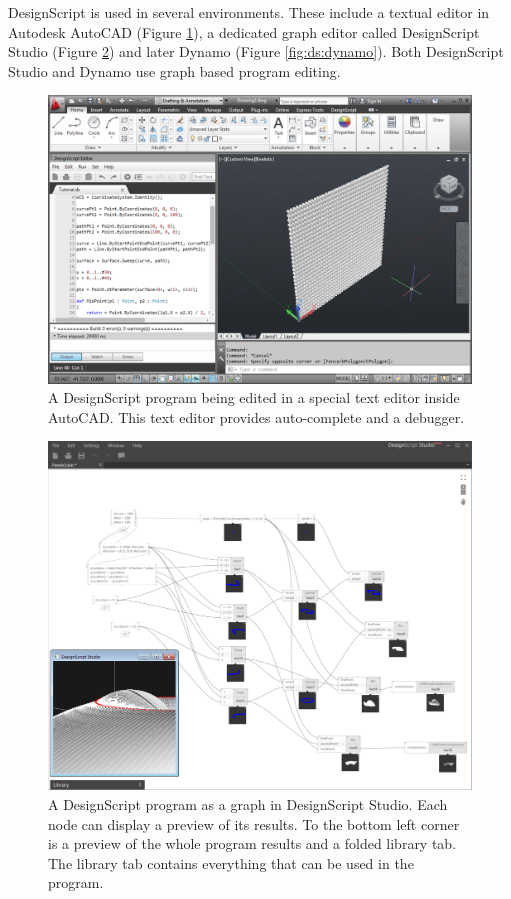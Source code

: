 \documentclass{./llncs2e/llncs}
\begin{document}
	DesignScript is used in several environments. 
	These include a textual editor in Autodesk AutoCAD (Figure \ref{fig:ds:autocad}), a dedicated graph editor called DesignScript Studio (Figure \ref{fig:ds:dsstudio}) and later Dynamo (Figure \ref{fig:ds:dynamo}). 
	Both DesignScript Studio and Dynamo use graph based program editing.
	
	\begin{figure}
		\centering
		\includegraphics[width=1.0\textwidth]{img/ds_autocad}
		\caption{A DesignScript program being edited in a special text editor inside AutoCAD. This text editor provides auto-complete and a debugger.}
		\label{fig:ds:autocad}
	\end{figure} 
	
	\begin{figure}
		\centering
		\includegraphics[width=1.0\textwidth]{img/ds_dsstudio}
		\caption{A DesignScript program as a graph in DesignScript Studio. Each node can display a preview of its results. To the bottom left corner is a preview of the whole program results and a folded library tab. The library tab contains everything that can be used in the program.}
		\label{fig:ds:dsstudio}
	\end{figure} 
	
\end{document}
